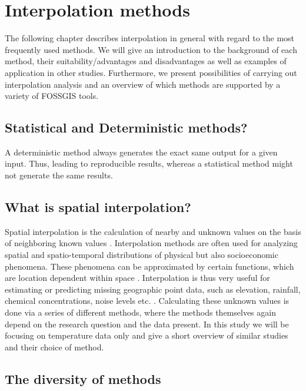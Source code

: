 
\section{Interpolation methods}

The following chapter describes interpolation in general with regard to the most frequently used methods. We will give an introduction to the background of each method, their suitability/advantages and disadvantages as well as examples of application in other studies. Furthermore, we present possibilities of carrying out interpolation analysis and an overview of which methods are supported by a variety of FOSSGIS tools.


\subsection{Statistical and Deterministic methods?}

A deterministic method always generates the exact same output for a given input. Thus, leading to reproducible results, whereas a statistical method might not generate the same results.

\subsection{What is spatial interpolation?}

Spatial interpolation is the calculation of nearby and unknown values on the basis of neighboring known values \cite{gitta_raumliche_2016}. Interpolation methods are often used for analyzing spatial and spatio-temporal distributions of physical but also socioeconomic phenomena. These phenomena can be approximated by certain functions, which are location dependent within space \cite{mitas_spatial_1999}. Interpolation is thus very useful for estimating or predicting missing geographic point data, such as elevation, rainfall, chemical concentrations, noise levels etc. \cite{samanta_interpolation_2012}. Calculating these unknown values is done via a series of different methods, where the methods themselves again depend on the research question and the data present. In this study we will be focusing on temperature data only and give a short overview of similar studies and their choice of method.

\subsection{The diversity of methods}

